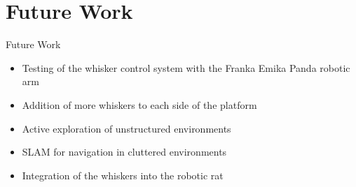 \documentclass[AIRbeamer
,optEnglish
,optBiber
,optBibstyleAlphabetic
,optBeamerClassicFormat%
]{AIRlatex}
\begin{document}
    \section{Future Work}
    \begin{frame}{Future Work}
        \begin{itemize}
            \item Testing of the whisker control system with the Franka Emika Panda robotic arm
            \item Addition of more whiskers to each side of the platform
            \item Active exploration of unstructured environments
            \item SLAM for navigation in cluttered environments
            \item Integration of the whiskers into the robotic rat
        \end{itemize}
    \end{frame}
\end{document}
